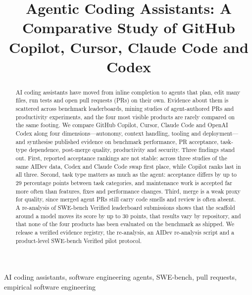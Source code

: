 \documentclass[conference]{IEEEtran}
\begin{document}
\title{Agentic Coding Assistants: A Comparative Study of GitHub Copilot, Cursor, Claude Code and Codex}

\author{
}

\maketitle

\begin{abstract}
AI coding assistants have moved from inline completion to agents that plan, edit many files, run tests and
open pull requests (PRs) on their own. Evidence about them is scattered across benchmark leaderboards,
mining studies of agent-authored PRs and productivity experiments, and the four most visible products are
rarely compared on the same footing. We compare GitHub Copilot, Cursor, Claude Code and OpenAI Codex along
four dimensions---autonomy, context handling, tooling and deployment---and synthesise published evidence on
benchmark performance, PR acceptance, task-type dependence, post-merge quality, productivity and security.
Three findings stand out. First, reported acceptance rankings are not stable: across three studies of the
same AIDev data, Codex and Claude Code swap first place, while Copilot ranks last in all three. Second, task
type matters as much as the agent: acceptance differs by up to 29 percentage points between task categories,
and maintenance work is accepted far more often than features, fixes and performance changes. Third, merge
is a weak proxy for quality, since merged agent PRs still carry code smells and review is often absent. A re-analysis of \swevSubs{} SWE-bench Verified leaderboard submissions shows that the scaffold
around a model moves its score by up to 30 points, that results vary by repository, and that none of the
four products has been evaluated on the benchmark as shipped. We release a verified evidence registry,
the re-analysis, an AIDev re-analysis script and a product-level SWE-bench Verified pilot protocol.
\end{abstract}

\begin{IEEEkeywords}
AI coding assistants, software engineering agents, SWE-bench, pull requests, empirical software engineering
\end{IEEEkeywords}
\end{document}
